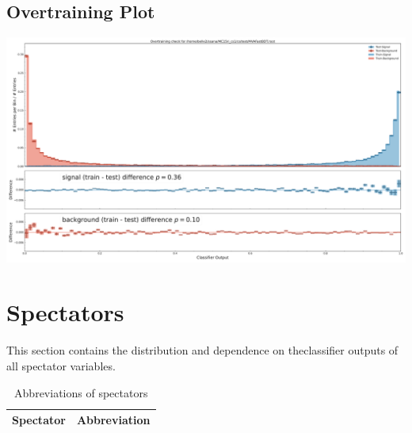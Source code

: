 \documentclass[10pt,a4paper]{article}
\begin{document}
\subsection{Overtraining Plot}
\begin{center}
\includegraphics[width=1.0\textwidth]{overtraining_plot_-936217630058450507.pdf}
\end{center}
\raggedbottom
\pagebreak[0]
\FloatBarrier
\section{Spectators}
This section contains the distribution and dependence on theclassifier outputs of all spectator variables.\begin{center}
\begin{longtable}{ll}
\caption{Abbreviations of spectators}\\
\toprule
Spectator & Abbreviation\\
\midrule
\bottomrule
\end{longtable}
\end{center}
\end{document}
